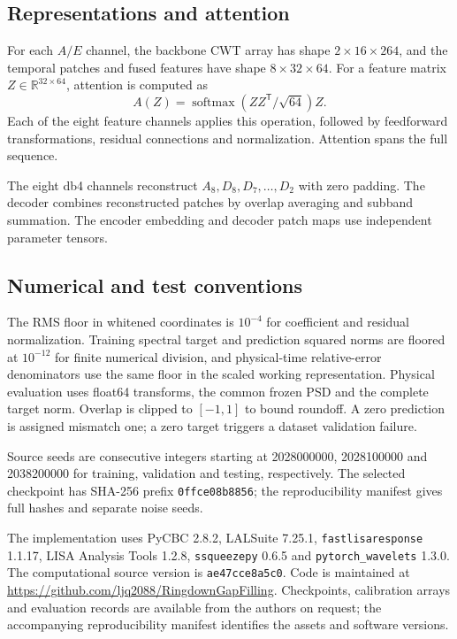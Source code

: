 \documentclass[10pt,prd,aps,a4paper,twocolumn,superscriptaddress,nofootinbib,floatfix]{revtex4-2}
\begin{document}
\subsection{Representations and attention}
For each $A/E$ channel, the backbone CWT array has shape $2\times16\times264$, and the temporal patches and fused features have shape $8\times32\times64$. For a feature matrix $Z\in\mathbb R^{32\times64}$, attention is computed as
\begin{equation}
A(Z)=\operatorname{softmax}(ZZ^{\mathsf T}/\sqrt{64})Z.
\end{equation}
Each of the eight feature channels applies this operation, followed by feedforward transformations, residual connections and normalization. Attention spans the full sequence.

The eight db4 channels reconstruct $A_8,D_8,D_7,\ldots,D_2$ with zero padding. The decoder combines reconstructed patches by overlap averaging and subband summation. The encoder embedding and decoder patch maps use independent parameter tensors.

\subsection{Numerical and test conventions}
The RMS floor in whitened coordinates is $10^{-4}$ for coefficient and residual normalization. Training spectral target and prediction squared norms are floored at $10^{-12}$ for finite numerical division, and physical-time relative-error denominators use the same floor in the scaled working representation. Physical evaluation uses float64 transforms, the common frozen PSD and the complete target norm. Overlap is clipped to $[-1,1]$ to bound roundoff. A zero prediction is assigned mismatch one; a zero target triggers a dataset validation failure.

Source seeds are consecutive integers starting at 2028000000, 2028100000 and 2038200000 for training, validation and testing, respectively. The selected checkpoint has SHA-256 prefix \texttt{0ffce08b8856}; the reproducibility manifest gives full hashes and separate noise seeds.

The implementation uses PyCBC 2.8.2, LALSuite 7.25.1, \texttt{fastlisaresponse} 1.1.17, LISA Analysis Tools 1.2.8, \texttt{ssqueezepy} 0.6.5 and \texttt{pytorch\_wavelets} 1.3.0. The computational source version is \texttt{ae47cce8a5c0}. Code is maintained at \url{https://github.com/ljq2088/RingdownGapFilling}. Checkpoints, calibration arrays and evaluation records are available from the authors on request; the accompanying reproducibility manifest identifies the assets and software versions.
\end{document}
